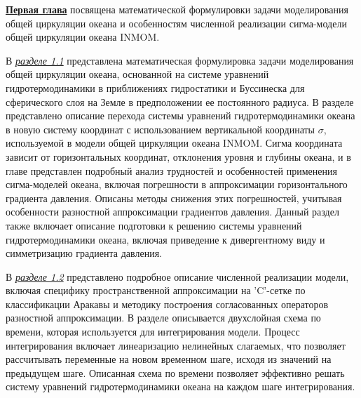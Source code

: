 
\underline{\textbf{Первая глава}} посвящена математической формулировки задачи моделирования общей циркуляции океана и особенностям численной реализации сигма-модели общей циркуляции океана INMOM.

В \underline{\textit{разделе 1.1}} представлена математическая формулировка задачи моделирования общей циркуляции океана, основанной на системе уравнений гидротермодинамики в приближениях гидростатики и Буссинеска для сферического слоя на Земле в предположении ее постоянного радиуса.
В разделе представлено описание перехода системы уравнений гидротермодинамики океана в новую систему координат с использованием вертикальной координаты $\sigma$, используемой в модели общей циркуляции океана INMOM.
Сигма координата зависит от горизонтальных координат, отклонения уровня и глубины океана, и в главе представлен подробный анализ трудностей и особенностей применения сигма-моделей океана, включая погрешности в аппроксимации горизонтального градиента давления. Описаны методы снижения этих погрешностей, учитывая особенности разностной аппроксимации градиентов давления.
Данный раздел также включает описание подготовки к решению системы уравнений гидротермодинамики океана, включая приведение к дивергентному виду и симметризацию градиента давления. 

В \underline{\textit{разделе 1.2}} представлено подробное описание численной реализации модели, включая специфику пространственной аппроксимации на 'C'-сетке по классификации Аракавы и методику построения согласованных операторов разностной аппроксимации.
В разделе описывается двухслойная схема по времени, которая используется для интегрирования модели. Процесс интегрирования включает линеаризацию нелинейных слагаемых, что позволяет рассчитывать переменные на новом временном шаге, исходя из значений на предыдущем шаге.
Описанная схема по времени позволяет эффективно решать систему уравнений гидротермодинамики океана на каждом шаге интегрирования.

